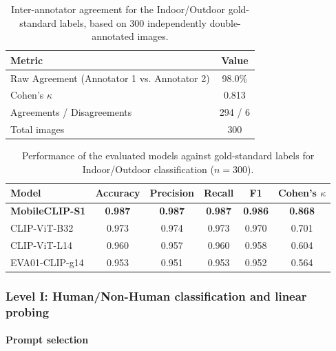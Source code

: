 \documentclass[11pt]{article}
\renewcommand{\_}{\textunderscore\allowbreak{}}
\begin{document}
\begin{table}[htbp]
\centering
\caption{Inter-annotator agreement for the Indoor/Outdoor gold-standard labels, based on 300 independently double-annotated images.}
\label{tab:interannotator_indooroutdoor}
\begin{tabular}{@{}lc@{}}
\toprule
\textbf{Metric} & \textbf{Value} \\
\midrule
Raw Agreement (Annotator 1 vs. Annotator 2) & 98.0\% \\
Cohen's $\kappa$                             & 0.813 \\
Agreements / Disagreements                    & 294 / 6 \\
Total images                                  & 300 \\
\bottomrule
\end{tabular}
\end{table}

\begin{table}[htbp]
\centering
\caption{Performance of the evaluated models against gold-standard labels for Indoor/Outdoor classification ($n=300$).}
\label{tab:gold_standard_validation_indooroutdoor}
\begin{tabular}{@{}lccccc@{}}
\toprule
\textbf{Model} & \textbf{Accuracy} & \textbf{Precision} & \textbf{Recall} & \textbf{F1} & \textbf{Cohen's $\kappa$} \\
\midrule
\textbf{MobileCLIP-S1} & \textbf{0.987} & \textbf{0.987} & \textbf{0.987} & \textbf{0.986} & \textbf{0.868} \\
CLIP-ViT-B32              & 0.973 & 0.974 & 0.973 & 0.970 & 0.701 \\
CLIP-ViT-L14              & 0.960 & 0.957 & 0.960 & 0.958 & 0.604 \\
EVA01-CLIP-g14            & 0.953 & 0.951 & 0.953 & 0.952 & 0.564 \\
\bottomrule
\end{tabular}
\end{table}

\subsubsection{Level I: Human/Non-Human classification and linear probing}

\paragraph{Prompt selection}
\end{document}
